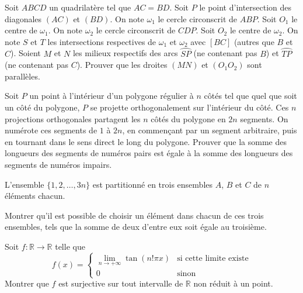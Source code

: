 \begin{exo}{}
Soit $ABCD$ un quadrilatère tel que $AC=BD$. Soit $P$ le point d'intersection des diagonales $(AC)$ et $(BD)$. On note $\omega_{1}$ le cercle circonscrit de $ABP$. Soit $O_{1}$ le centre de $ \omega_{1}$. On note $ \omega_{2}$ le cercle circonscrit de $CDP$. Soit $O_{2}$ le centre de $ \omega_{2}$. On note $S$ et $T$ les intersections respectives de $ \omega_{1}$ et $ \omega_{2}$ avec $[BC]$ (autres que $B$ et $C$). Soient $M$ et $N$ les milieux respectifs des arcs $ \wideparen {SP}$ (ne contenant pas $B$) et $ \wideparen {TP}$ (ne contenant pas $C$). Prouver que les droites $(MN)$ et $(O_{1} O_{2})$ sont parallèles.
\end{exo}

\begin{exo}{ }
Soit $P$ un point à l'intérieur d'un polygone régulier à $n$ côtés tel que quel que soit un côté du polygone, $P$ se projette orthogonalement sur l'intérieur du côté. Ces $n$ projections orthogonales partagent les $n$ côtés du polygone en $2n$ segments. On numérote ces segments de $1$ à $2n$, en commençant par un segment arbitraire, puis en tournant dans le sens direct le long du polygone. Prouver que la somme des longueurs des segments de numéros pairs est égale à la somme des longueurs des segments de numéros impairs.
\end{exo}

\begin{exo}{}
L'ensemble $\lbrace 1, 2, \ldots ,3n\rbrace$ est partitionné en trois ensembles $A$, $B$ et $C$ de $n$ éléments chacun.

 Montrer qu'il est possible de choisir un élément dans chacun de ces trois ensembles, tels que la somme de deux d'entre eux soit égale au troisième.
\end{exo}

\begin{exo}{}
Soit $f: \mathbb{R} \to \mathbb{R}$ telle que
\[f(x) = \begin{cases} \lim \limits_{n \to + \infty} \tan (n!\pi x) & \text{si cette limite existe} \\ 0 & \text{sinon} \end{cases}\]
Montrer que $f$ est surjective sur tout intervalle de $\mathbb{R}$ non réduit à un point.\end{exo}

